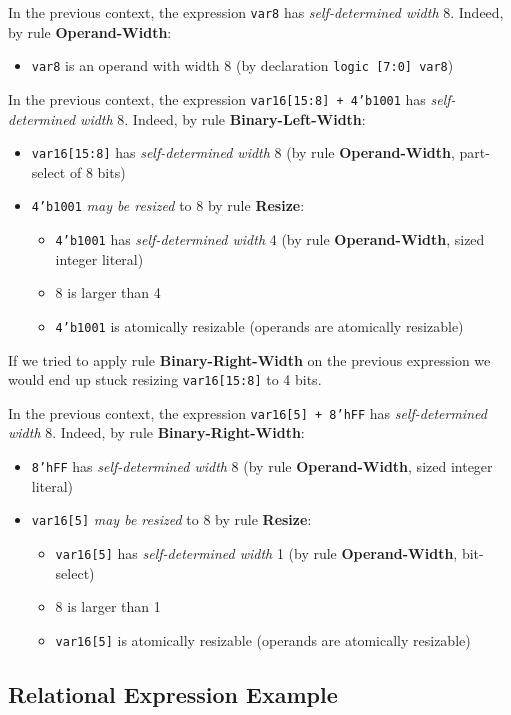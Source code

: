 \documentclass{article}
\newcommand{\sv}[1]{\texttt{#1}}
\newcommand{\sds}{\emph{self-determined width}}
\newcommand{\mbr}{\emph{may be resized}}
\begin{document}
In the previous context, the expression \sv{var8} has
\sds{} 8. Indeed, by rule \textbf{Operand-Width}:
\begin{itemize}
  \item \sv{var8} is an operand with width 8 (by declaration
    \sv{logic [7:0] var8})
\end{itemize}

In the previous context, the expression \sv{var16[15:8] + 4'b1001} has
\sds{} 8. Indeed, by rule \textbf{Binary-Left-Width}:

\begin{itemize}
  \item \sv{var16[15:8]} has \sds{} 8 (by rule
    \textbf{Operand-Width}, part-select of 8 bits)
  \item \sv{4'b1001} \mbr{} to 8 by rule \textbf{Resize}:
    \begin{itemize}
      \item \sv{4'b1001} has \sds{} 4 (by rule
        \textbf{Operand-Width}, sized integer literal)
      \item 8 is larger than 4
      \item \sv{4'b1001} is atomically resizable (operands are
        atomically resizable)
    \end{itemize}
\end{itemize}

If we tried to apply rule \textbf{Binary-Right-Width} on the previous expression
we would end up stuck resizing \sv{var16[15:8]} to 4 bits.

In the previous context, the expression \sv{var16[5] + 8'hFF} has
\sds{} 8. Indeed, by rule \textbf{Binary-Right-Width}:

\begin{itemize}
  \item \sv{8'hFF} has \sds{} 8 (by rule
    \textbf{Operand-Width}, sized integer literal)
  \item \sv{var16[5]} \mbr{} to 8 by rule \textbf{Resize}:
    \begin{itemize}
      \item \sv{var16[5]} has \sds{} 1 (by rule
        \textbf{Operand-Width}, bit-select)
      \item 8 is larger than 1
      \item \sv{var16[5]} is atomically resizable (operands are
        atomically resizable)
    \end{itemize}
\end{itemize}

\subsection{Relational Expression Example}
\end{document}
